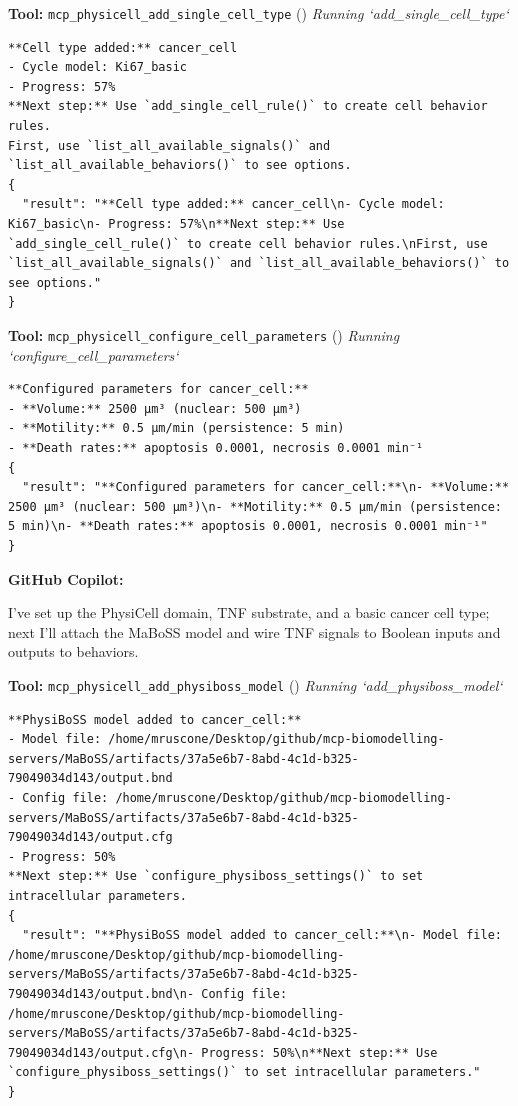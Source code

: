 \documentclass[11pt,a4paper]{article}
\begin{document}
\begin{toolokbox}
\textbf{Tool:} \texttt{mcp\_physicell\_add\_single\_cell\_type} (\checkmark)
\textit{Running `add\_single\_cell\_type`}
\begin{lstlisting}
**Cell type added:** cancer_cell
- Cycle model: Ki67_basic
- Progress: 57%
**Next step:** Use `add_single_cell_rule()` to create cell behavior rules.
First, use `list_all_available_signals()` and `list_all_available_behaviors()` to see options.
{
  "result": "**Cell type added:** cancer_cell\n- Cycle model: Ki67_basic\n- Progress: 57%\n**Next step:** Use `add_single_cell_rule()` to create cell behavior rules.\nFirst, use `list_all_available_signals()` and `list_all_available_behaviors()` to see options."
}
\end{lstlisting}
\end{toolokbox}
\begin{toolokbox}
\textbf{Tool:} \texttt{mcp\_physicell\_configure\_cell\_parameters} (\checkmark)
\textit{Running `configure\_cell\_parameters`}
\begin{lstlisting}
**Configured parameters for cancer_cell:**
- **Volume:** 2500 μm³ (nuclear: 500 μm³)
- **Motility:** 0.5 μm/min (persistence: 5 min)
- **Death rates:** apoptosis 0.0001, necrosis 0.0001 min⁻¹
{
  "result": "**Configured parameters for cancer_cell:**\n- **Volume:** 2500 μm³ (nuclear: 500 μm³)\n- **Motility:** 0.5 μm/min (persistence: 5 min)\n- **Death rates:** apoptosis 0.0001, necrosis 0.0001 min⁻¹"
}
\end{lstlisting}
\end{toolokbox}
\begin{copilotbox}
\textbf{GitHub Copilot:}

I’ve set up the PhysiCell domain, TNF substrate, and a basic cancer cell type; next I’ll attach the MaBoSS model and wire TNF signals to Boolean inputs and outputs to behaviors.

\end{copilotbox}
\begin{toolokbox}
\textbf{Tool:} \texttt{mcp\_physicell\_add\_physiboss\_model} (\checkmark)
\textit{Running `add\_physiboss\_model`}
\begin{lstlisting}
**PhysiBoSS model added to cancer_cell:**
- Model file: /home/mruscone/Desktop/github/mcp-biomodelling-servers/MaBoSS/artifacts/37a5e6b7-8abd-4c1d-b325-79049034d143/output.bnd
- Config file: /home/mruscone/Desktop/github/mcp-biomodelling-servers/MaBoSS/artifacts/37a5e6b7-8abd-4c1d-b325-79049034d143/output.cfg
- Progress: 50%
**Next step:** Use `configure_physiboss_settings()` to set intracellular parameters.
{
  "result": "**PhysiBoSS model added to cancer_cell:**\n- Model file: /home/mruscone/Desktop/github/mcp-biomodelling-servers/MaBoSS/artifacts/37a5e6b7-8abd-4c1d-b325-79049034d143/output.bnd\n- Config file: /home/mruscone/Desktop/github/mcp-biomodelling-servers/MaBoSS/artifacts/37a5e6b7-8abd-4c1d-b325-79049034d143/output.cfg\n- Progress: 50%\n**Next step:** Use `configure_physiboss_settings()` to set intracellular parameters."
}
\end{lstlisting}
\end{toolokbox}
\end{document}
